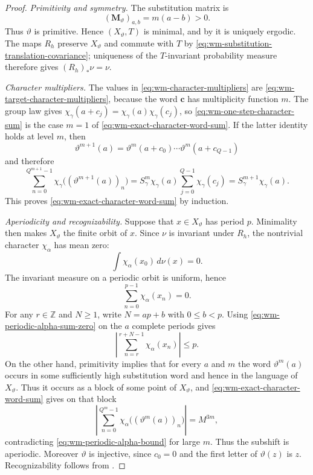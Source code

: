 \documentclass[11pt,reqno,a4paper]{amsart}
\numberwithin{equation}{section}
\theoremstyle{compact}
\theoremstyle{definition}
\theoremstyle{definition}
\begin{document}
\begin{proof}
\smallskip\noindent\emph{Primitivity and symmetry.}
The substitution matrix is
\begin{equation}\label{eq:wm-specific-substitution-matrix}
  (\mathbf M_\vartheta)_{a,b}=m(a-b)>0.
\end{equation}
Thus $\vartheta$ is primitive.  Hence $(X_\vartheta,T)$ is minimal, and by
\cite[Theorem~5.6]{Que10} it is uniquely ergodic.  The maps $R_h$ preserve
$X_\vartheta$ and commute with $T$ by
\eqref{eq:wm-substitution-translation-covariance}; uniqueness of the
$T$-invariant probability measure therefore gives $(R_h)_*\nu=\nu$.

\smallskip\noindent\emph{Character multipliers.}
The values in \eqref{eq:wm-character-multipliers} are
\eqref{eq:wm-target-character-multipliers}, because the word $\mathbf c$
has multiplicity function $m$.  The group law gives
$\chi_\gamma(a+c_j)=\chi_\gamma(a)\chi_\gamma(c_j)$, so
\eqref{eq:wm-one-step-character-sum} is the case $m=1$ of
\eqref{eq:wm-exact-character-word-sum}.  If the latter identity holds at
level $m$, then
\[
  \vartheta^{m+1}(a)
  =\vartheta^m(a+c_0)\cdots\vartheta^m(a+c_{Q-1})
\]
and therefore
\[
  \sum_{n=0}^{Q^{m+1}-1}
    \chi_\gamma\bigl((\vartheta^{m+1}(a))_n\bigr)
  =S_\gamma^m\chi_\gamma(a)
     \sum_{j=0}^{Q-1}\chi_\gamma(c_j)
  =S_\gamma^{m+1}\chi_\gamma(a).
\]
This proves \eqref{eq:wm-exact-character-word-sum} by induction.

\smallskip\noindent\emph{Aperiodicity and recognizability.}
Suppose that $x\in X_\vartheta$ has period $p$.  Minimality then makes
$X_\vartheta$ the finite orbit of $x$.  Since $\nu$ is invariant under
$R_h$, the nontrivial character $\chi_\alpha$ has mean zero:
\[
  \int\chi_\alpha(x_0)\,d\nu(x)=0.
\]
The invariant measure on a periodic orbit is uniform, hence
\begin{equation}\label{eq:wm-periodic-alpha-sum-zero}
  \sum_{n=0}^{p-1}\chi_\alpha(x_n)=0.
\end{equation}
For any $r\in\mathbb Z$ and $N\geq1$, write $N=ap+b$ with
$0\leq b<p$.  Using \eqref{eq:wm-periodic-alpha-sum-zero} on the $a$
complete periods gives
\begin{equation}\label{eq:wm-periodic-alpha-bound}
  \left|\sum_{n=r}^{r+N-1}\chi_\alpha(x_n)\right|\leq p.
\end{equation}
On the other hand, primitivity implies that for every $a$ and $m$ the word
$\vartheta^m(a)$ occurs in some sufficiently high substitution word and
hence in the language of $X_\vartheta$.  Thus it occurs as a block of some
point of $X_\vartheta$, and \eqref{eq:wm-exact-character-word-sum} gives on
that block
\begin{equation}\label{eq:wm-alpha-word-growth}
  \left|
  \sum_{n=0}^{Q^m-1}
  \chi_\alpha\bigl((\vartheta^m(a))_n\bigr)
  \right|=M^{3m},
\end{equation}
contradicting \eqref{eq:wm-periodic-alpha-bound} for large $m$.  Thus the
subshift is aperiodic.  Moreover $\vartheta$ is injective, since
$c_0=0$ and the first letter of $\vartheta(z)$ is $z$.  Recognizability
follows from \cite[Theorem~4.34]{Bru22}.
\end{proof}
\end{document}
